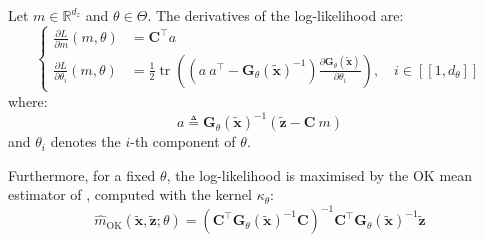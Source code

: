 \begin{proposition}\label{th:MLE}
	Let $m\in\mathbb{R}^{d_z}$ and $\theta\in\Theta$. The derivatives of the log-likelihood are:
	\begin{equation}
		\left\{\begin{aligned}
		\frac{\partial L}{\partial m}(m,\theta)&=\mathbf{C}^\top a\\
		\frac{\partial L}{\partial\theta_i}(m,\theta)&=\frac{1}{2}\operatorname{tr}\left(\left(a\:a^\top-\mathbf{G}_\theta(\tilde{\mathbf{x}})^{-1}\right)\frac{\partial \mathbf{G}_\theta(\tilde{\mathbf{x}})}{\partial\theta_i}\right),\quad i\in[\![1,d_\theta]\!]
		\end{aligned}\right.
	\end{equation}
	where:
	\begin{equation}
		a\triangleq \mathbf{G}_\theta(\tilde{\mathbf{x}})^{-1}\left(\tilde{\mathbf{z}}-\mathbf{C}\:m\right)
	\end{equation}
	and $\theta_i$ denotes the $i$-th component of $\theta$.

	Furthermore, for a fixed $\theta$, the log-likelihood is maximised by the OK mean estimator of , computed with the kernel $\kappa_\theta$:
	\begin{equation}
		\hat{m}_{\mathrm{OK}}(\tilde{\mathbf{x}},\tilde{\mathbf{z}};\theta)=\left(\mathbf{C}^\top \mathbf{G}_\theta(\tilde{\mathbf{x}})^{-1}\mathbf{C}\right)^{-1}\mathbf{C}^\top \mathbf{G}_\theta(\tilde{\mathbf{x}})^{-1}\tilde{\mathbf{z}}\label{eq:profiled_mean}
	\end{equation}
\end{proposition}

